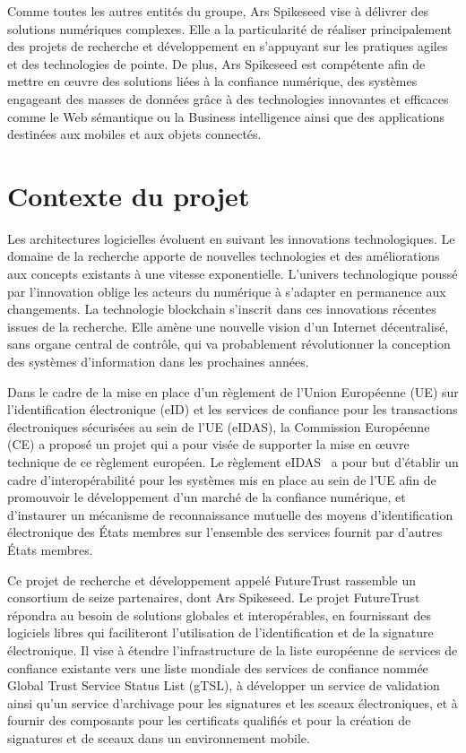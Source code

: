 \documentclass{tnreport}
\begin{document}
Comme toutes les autres entités du groupe, Ar{\texteta}s Spikeseed vise à délivrer des solutions numériques complexes. Elle a la particularité de réaliser principalement des projets de recherche et développement en s'appuyant sur les pratiques agiles et des technologies de pointe. 
De plus, Ar{\texteta}s Spikeseed est compétente afin de mettre en œuvre 
des solutions liées à la confiance numérique, 
des systèmes engageant des masses de données grâce à des technologies innovantes et efficaces comme le Web sémantique ou la Business intelligence ainsi que 
des applications destinées aux mobiles et aux objets connectés.

\section{Contexte du projet}

Les architectures logicielles évoluent en suivant les innovations technologiques. Le domaine de la recherche apporte de nouvelles technologies et des améliorations aux concepts existants à une vitesse exponentielle. L'univers technologique poussé par l'innovation oblige les acteurs du numérique à s'adapter en permanence aux changements. La technologie blockchain s'inscrit dans ces innovations récentes issues de la recherche. Elle amène une nouvelle vision d'un Internet décentralisé, sans organe central de contrôle, qui va probablement révolutionner la conception des systèmes d'information dans les prochaines années.

Dans le cadre de la mise en place d'un règlement de l'Union Européenne (UE) sur l'identification électronique (eID) et les services de confiance pour les transactions électroniques sécurisées au sein de l'UE (eIDAS), la Commission Européenne (CE) a proposé un projet qui a pour visée de supporter la mise en œuvre technique de ce règlement européen. 
Le règlement eIDAS~\cite{eIDAS} a pour but d'établir un cadre d’interopérabilité pour les systèmes mis en place au sein de l'UE afin de promouvoir le développement d’un marché de la confiance numérique, et d'instaurer un mécanisme de reconnaissance mutuelle des moyens d’identification électronique des États membres sur l’ensemble des services fournit par d'autres États membres.

Ce projet de recherche et développement appelé FutureTrust rassemble un consortium de seize partenaires, dont Ar{\texteta}s Spikeseed. 
Le projet FutureTrust répondra au besoin de solutions globales et interopérables, en fournissant des logiciels libres qui faciliteront l'utilisation de l'identification et de la signature électronique. 
Il vise à étendre l'infrastructure de la liste européenne de services de confiance existante vers une liste mondiale des services de confiance nommée Global Trust Service Status List (gTSL), à développer un service de validation ainsi qu'un service d'archivage pour les signatures et les sceaux électroniques, et à fournir des composants pour les certificats qualifiés et pour la création de signatures et de sceaux dans un environnement mobile.
\end{document}
